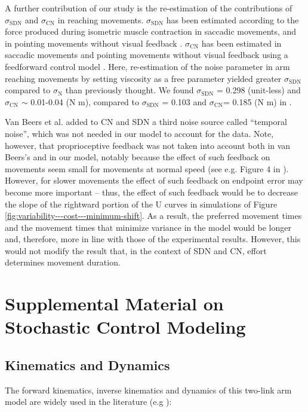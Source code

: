 A further contribution of our study is the re-estimation of the contributions of $\sigma_{\text{SDN}}$ and $\sigma_{\text{CN}}$ in reaching movements. 
$\sigma_{\text{SDN}}$ has been estimated according to the force produced during isometric muscle contraction \cite{Jones2002, Slifkin1999} in saccadic movements, and in pointing movements without visual feedback \cite{VanBeers2004}. $\sigma_{\text{CN}}$ has been estimated in saccadic movements \cite{VanBeers2008} and pointing movements without visual feedback using a feedforward control model \cite{VanBeers2004}. 
Here, re-estimation of the noise parameter in arm reaching movements by setting viscosity as a free parameter yielded greater $\sigma_{\text{SDN}}$ compared to $\sigma_{\text{N}}$ than previously thought. We found $\sigma_{\text{SDN}}$ = 0.298 (unit-less) and $\sigma_{\text{CN}}$ $\sim$ 0.01-0.04 (N m), compared to $\sigma_{\text{SDN}}$ = 0.103 and $\sigma_{\text{CN}}$= 0.185 (N m) in \cite{VanBeers2004}. 

Van Beers et al. added to CN and SDN a third noise source called “temporal noise”, which was not needed in our model to account for the data. 
Note, however, that proprioceptive feedback was not taken into account both in van Beers’s and in our model, notably because the effect of such feedback on movements seem small for movements at normal speed (see e.g. Figure 4 in \cite{Franklin2007}). 
However, for slower movements the effect of such feedback on endpoint error may become more important – thus, the effect of such feedback would be to decrease the slope of the rightward portion of the U curves in simulations of Figure \ref{fig:variability---cost---minimum-shift}. 
As a result, the preferred movement times and the movement times that minimize variance in the model would be longer and, therefore, more in line with those of the experimental results. 
However, this would not modify the result that, in the context of SDN and CN, effort determines movement duration.


\section{Supplemental Material on Stochastic Control Modeling}
\label{app:oc}

\subsection{Kinematics and Dynamics}
\label{app:kindyn}
The forward kinematics, inverse kinematics and dynamics of this two-link arm model are widely used in the literature (e.g \cite{VanBeers2004}):

